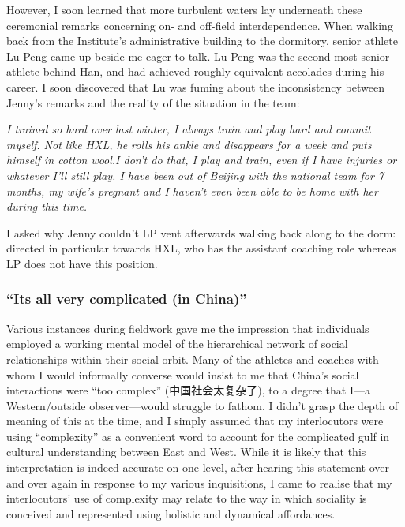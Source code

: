 \begin{CJK}{UTF8}{gbsn}
However, I soon learned that more turbulent waters lay underneath these ceremonial remarks concerning on- and off-field interdependence.
When walking back from the Institute’s administrative building to the dormitory, senior athlete Lu Peng came up beside me eager to talk.  Lu Peng was the second-most senior athlete behind Han, and had achieved roughly equivalent accolades during his career.  I soon discovered that Lu was fuming about the inconsistency between Jenny’s remarks and the reality of the situation in the team:

\textit{I trained so hard over last winter, I always train and play hard and commit myself.  Not like HXL, he rolls his ankle and disappears for a week and puts himself in cotton wool.I don’t do that, I play and train, even if I have injuries or whatever I’ll still play.  I have been out of Beijing with the national team for 7 months, my wife’s pregnant and I haven’t even been able to be home with her during this time.}

I asked why Jenny couldn’t
LP vent afterwards walking back along to the dorm: directed in particular towards HXL, who has the assistant coaching role whereas LP does not have this position.




\subsubsection{``Its all very complicated (in China)''\label{sect:allComplicated}}

Various instances during fieldwork gave me the impression that individuals employed a working mental model of the hierarchical network of social relationships within their social orbit.
Many of the athletes and coaches with whom I would informally converse would insist to me that China's social interactions were ``too complex'' (中国社会太复杂了), to a degree that I---a Western/outside observer---would struggle to fathom. I didn't grasp the depth of meaning of this at the time, and I simply assumed that my interlocutors were using ``complexity'' as a convenient word to account for the complicated gulf in cultural understanding between East and West.  While it is likely that this interpretation is indeed accurate on one level, after hearing this statement over and over again in response to my various inquisitions, I came to realise that my interlocutors' use of complexity may relate to the way in which sociality is conceived and represented using holistic and dynamical affordances.


\end{CJK}

